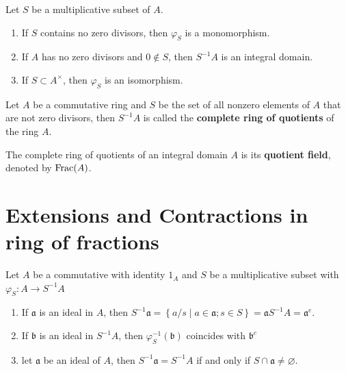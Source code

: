 \begin{theorem}
    Let $S$ be a multiplicative subset of $A$.
    \begin{enumerate}
        \item
              If $S$ contains no zero divisors, then $\varphi_{{S}}$ is a monomorphism.
        \item
              If $A$ has no zero divisors and $0 \notin {S}$, then ${S}^{-1} {A}$ is an integral domain.

        \item
              If $S\subset A^\times$, then $\varphi_{{S}}$ is an isomorphism.
    \end{enumerate}
\end{theorem}




\begin{definition}
    Let $A$ be a commutative ring and $S$ be the set of all nonzero elements of $A$ that are not zero divisors, then $S^{-1} A$ is called the \textbf{complete ring of quotients} of the ring $A$.

    The complete ring of quotients of an integral domain $A$ is its \textbf{quotient field}, denoted by $\operatorname{Frac}(A)$.
\end{definition}


\section{Extensions and Contractions in ring of fractions} %
Let $A$ be a commutative with identity $1_A$ and $S$ be a multiplicative subset with $\varphi_S:A\rightarrow S^{-1}A$

\begin{proposition}
    \begin{enumerate}
        \item
              If $\mathfrak{a}$ is an ideal in $A$, then $S^{-1} \mathfrak{a}=\left\{a / s \mid a \in \mathfrak{a} ; s \in S\right\}=\mathfrak{a} S^{-1}A=\mathfrak{a}^e$.
        \item
              If $\mathfrak{b}$ is an ideal in $S^{-1}A$, then $\varphi_S^{-1}\left(\mathfrak{b}\right)$ coincides with $\mathfrak{b}^c$
        \item
              let $\mathfrak{a}$ be an ideal of $A$, then  $S^{-1} \mathfrak{a}=S^{-1} A$ if and only if $S \cap \mathfrak{a} \neq \varnothing$.
    \end{enumerate}
\end{proposition}

